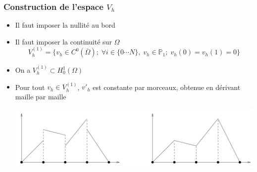 \documentclass{beamer}
\begin{document}
\begin{frame}
\frametitle{Construction de l'espace $V_h$}


\begin{itemize}
\item Il faut imposer la nullité au bord
\item Il faut imposer la continuité sur $\Omega$
\[V_h^{(1)}=\{v_h\in C^0(\overline{\Omega});\; \forall i\in\{0\cdots N\},\;v_h\in \mathbb{P}_1;\; v_h(0)=v_h(1)=0\}\]
\item On a $V_h^{(1)}\subset H^1_0(\Omega)$
\item Pour tout $v_h \in V_h^{(1)}$, $v'_h$ est constante par morceaux, obtenue en dérivant maille par maille
\begin{center}
\includegraphics[scale=0.18]{VhD1.png} 
\end{center}
\end{itemize}

\end{frame}
\end{document}
